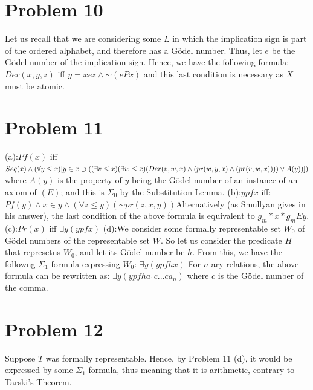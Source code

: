 \documentclass{article}
\newcommand*{\oldneg}{\mathord{\sim}}
\theoremstyle{definition}
\begin{document}
\section*{Problem 10}
Let us recall that we are considering some $L$ in which the implication sign is part of the ordered alphabet, and therefore has a Gödel number. Thus, 
let $e$ be the Gödel number of the implication sign. Hence, we have the following formula:\newline $Der(x,y,z)$ iff $y=xez\wedge \oldneg (ePx)$ and this 
last condition is necessary as $X$ must be atomic.
\section*{Problem 11}
(a):\newline $Pf(x)$ iff $Seq(x)\wedge (\forall y\le x)[y\in x\supset \newline
((\exists v\le x)(\exists w \le x)(Der(v,w,x)\wedge (pr(w,y,x)\wedge (pr(v,w,x))))\vee A(y))])$ where $A(y)$ is the property of $y$ being the Gödel number 
of an instance of an axiom of $(E)$; and this is $\Sigma_0$ by the Substitution Lemma.\newline
(b):\newline $ypfx$ iff:\newline $Pf(y)\wedge x\in y\wedge (\forall z\le y)(\oldneg pr(z,x,y))$\newline Alternatively (as Smullyan gives in his answer), 
the last condition of the above formula is equivalent to $g_m*x*g_mEy$.\newline
(c):\newline $Pr(x)$ iff $\exists y(ypfx)$\newline
(d):\newline We consider some formally representable set $W_0$ of Gödel numbers of the representable set $W$. So let us consider the predicate $H$ 
that represetns $W_0$, and let its Gödel number be $h$. From this, we have the followng $\Sigma_1$ formula expressing $W_0$:\newline
$\exists y(ypfhx)$\newline
For $n$-ary relations, the above formula can be rewritten as:\newline
$\exists y(ypfha_1c...ca_n)$ where $c$ is the Gödel number of the comma.
\section*{Problem 12}
Suppose $T$ was formally representable. Hence, by Problem 11 (d), it would be expressed by some $\Sigma_1$ formula, thus meaning that it is arithmetic, 
contrary to Tarski's Theorem.
\end{document}
